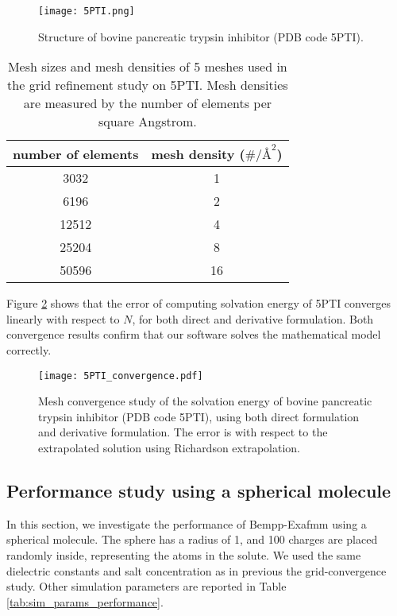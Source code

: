 \begin{figure}[htbp]
    \centering
    \texttt{[image: 5PTI.png]}
    \caption{Structure of bovine pancreatic trypsin inhibitor (PDB code 5PTI).}
    \label{fig:5PTI_structure}
\end{figure}

\begin{table}[]
    \centering
    \begin{tabular}{cc}
    number of elements & mesh density ($\#/{\si{\angstrom}}^2$) \\
    \hline
    3032               & 1                                       \\
    6196               & 2                                       \\
    12512              & 4                                       \\
    25204              & 8                                       \\
    50596              & 16                                     
    \end{tabular}
    \caption{Mesh sizes and mesh densities of 5 meshes used in the grid refinement study on 5PTI. Mesh densities are measured by the number of elements per square Angstrom.}
    \label{tab:5PTI_mesh}
\end{table}

Figure \ref{fig:5PTI_convergence} shows that the error of computing solvation energy of 5PTI converges linearly with respect to $N$, for both direct and derivative formulation.
Both convergence results confirm that our software solves the mathematical model correctly.

\begin{figure}[htbp]
    \centering
    \texttt{[image: 5PTI\_convergence.pdf]} 
    \caption{Mesh convergence study of the solvation energy of bovine pancreatic trypsin inhibitor (PDB code 5PTI), using both direct formulation and derivative formulation.
    The error is with respect to the extrapolated solution using Richardson extrapolation.}
    \label{fig:5PTI_convergence}
\end{figure}

\subsection{Performance study using a spherical molecule}

In this section, we investigate the performance of Bempp-Exafmm using a spherical molecule.
The sphere has a radius of 1, and 100 charges are placed randomly inside, representing the atoms in the solute.
We used the same dielectric constants and salt concentration as in previous the grid-convergence study.
Other simulation parameters are reported in Table \ref{tab:sim_params_performance}.

